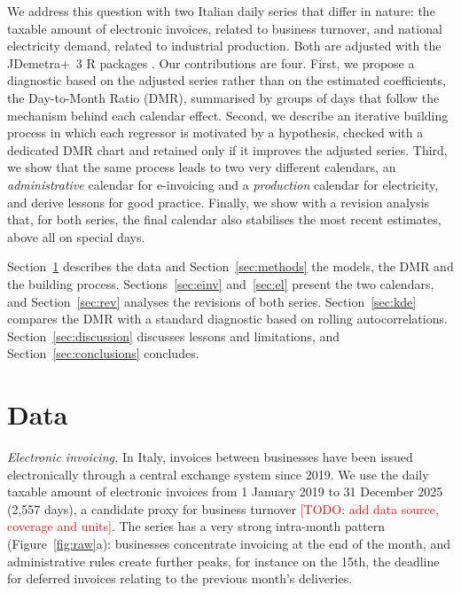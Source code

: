 \documentclass[Afour, times]{sagej}
\newcommand{\todo}[1]{\textcolor{red}{[TODO: #1]}}
\begin{document}
We address this question with two Italian daily series that differ in nature: the taxable amount of electronic invoices, related to business turnover, and national electricity demand, related to industrial production. Both are adjusted with the JDemetra+~3 R packages \cite{webelsmyk2023,rjdverse}. Our contributions are four. First, we propose a diagnostic based on the adjusted series rather than on the estimated coefficients, the Day-to-Month Ratio (DMR), summarised by groups of days that follow the mechanism behind each calendar effect. Second, we describe an iterative building process in which each regressor is motivated by a hypothesis, checked with a dedicated DMR chart and retained only if it improves the adjusted series. Third, we show that the same process leads to two very different calendars, an \emph{administrative} calendar for e-invoicing and a \emph{production} calendar for electricity, and derive lessons for good practice. Finally, we show with a revision analysis that, for both series, the final calendar also stabilises the most recent estimates, above all on special days.

Section~\ref{sec:data} describes the data and Section~\ref{sec:methods} the models, the DMR and the building process. Sections~\ref{sec:einv} and~\ref{sec:el} present the two calendars, and Section~\ref{sec:rev} analyses the revisions of both series. Section~\ref{sec:kde} compares the DMR with a standard diagnostic based on rolling autocorrelations. Section~\ref{sec:discussion} discusses lessons and limitations, and Section~\ref{sec:conclusions} concludes.

\section{Data}
\label{sec:data}

\textit{Electronic invoicing.} In Italy, invoices between businesses have been issued electronically through a central exchange system since 2019. We use the daily taxable amount of electronic invoices from 1 January 2019 to 31 December 2025 (2,557 days), a candidate proxy for business turnover \todo{add data source, coverage and units}. The series has a very strong intra-month pattern (Figure~\ref{fig:raw}a): businesses concentrate invoicing at the end of the month, and administrative rules create further peaks, for instance on the 15th, the deadline for deferred invoices relating to the previous month's deliveries.
\end{document}

